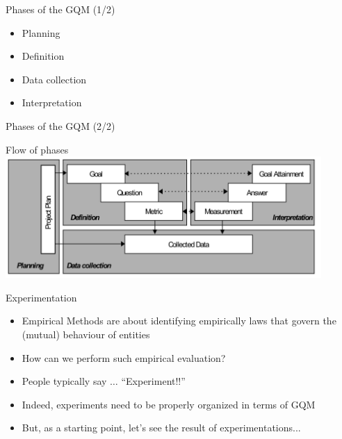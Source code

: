 \documentclass{beamer}
\begin{document}
\begin{frame}
{\centerline{Phases of the GQM (1/2)}}

\begin{itemize}
\item Planning
\item Definition
\item Data collection
\item Interpretation
\end{itemize}


\end{frame}

\begin{frame}
{\centerline{Phases of the GQM (2/2)}}

\begin{center}
\Large Flow of phases\\
\vspace{1cm}
\includegraphics[width=120mm]{A2022.IDSEPC.SperimentazioneDeduzione/PhasesGQM.png}
\end{center}


\end{frame}



\begin{frame}
{\centerline{Experimentation}}

\begin{itemize}
\item Empirical Methods are about identifying empirically laws that govern the (mutual) behaviour of entities
\item How can we perform such empirical evaluation?
\item People typically say $\ldots$ ``Experiment!!''
\item Indeed, experiments need to be properly organized in terms of GQM
\item But, as a starting point, let's see the result of experimentations...
\end{itemize}


\end{frame}
\end{document}
